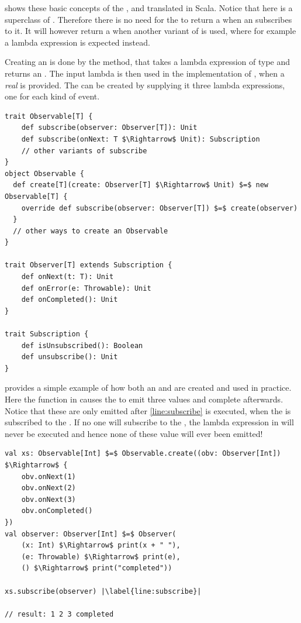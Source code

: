  shows these basic concepts of the \obs, \obv and \subs translated in Scala. Notice that here \subs is a superclass of \obv. Therefore there is no need for the \obs to return a \subs when an \obv subscribes to it. It will however return a \subs when another variant of  is used, where for example a lambda expression is expected instead.

Creating an \obs is done by the  method, that takes a lambda expression of type  and returns an \obs. The input lambda is then used in the implementation of , when a \emph{real} \obv is provided. The \obv can be created by supplying it three lambda expressions, one for each kind of event.

\begin{minipage}{\linewidth}
\begin{lstlisting}[style=ScalaStyle, caption={Observable, Observer and Subscription}, label={lst:obs-obv}]
trait Observable[T] {
    def subscribe(observer: Observer[T]): Unit
    def subscribe(onNext: T $\Rightarrow$ Unit): Subscription
    // other variants of subscribe
}
object Observable {
  def create[T](create: Observer[T] $\Rightarrow$ Unit) $=$ new Observable[T] {
    override def subscribe(observer: Observer[T]) $=$ create(observer)
  }
  // other ways to create an Observable
}

trait Observer[T] extends Subscription {
    def onNext(t: T): Unit
    def onError(e: Throwable): Unit
    def onCompleted(): Unit
}

trait Subscription {
    def isUnsubscribed(): Boolean
    def unsubscribe(): Unit
}
\end{lstlisting}
\end{minipage}

 provides a simple example of how both an \obs and \obv are created and used in practice. Here the function in  causes the \obs to emit three values and complete afterwards. Notice that these are only emitted after \cref{line:subscribe} is executed, when the \obv is subscribed to the \obs. If no one will subscribe to the \obs, the lambda expression in  will never be executed and hence none of these value will ever been emitted!

\begin{minipage}{\linewidth}
\begin{lstlisting}[style=ScalaStyle, caption={Creating and subscribing to an \obs}, label={lst:create-sub-obs}]
val xs: Observable[Int] $=$ Observable.create((obv: Observer[Int]) $\Rightarrow$ {
    obv.onNext(1)
    obv.onNext(2)
    obv.onNext(3)
    obv.onCompleted()
})
val observer: Observer[Int] $=$ Observer(
    (x: Int) $\Rightarrow$ print(x + " "),
    (e: Throwable) $\Rightarrow$ print(e),
    () $\Rightarrow$ print("completed"))

xs.subscribe(observer) |\label{line:subscribe}|

// result: 1 2 3 completed
\end{lstlisting}
\end{minipage}

